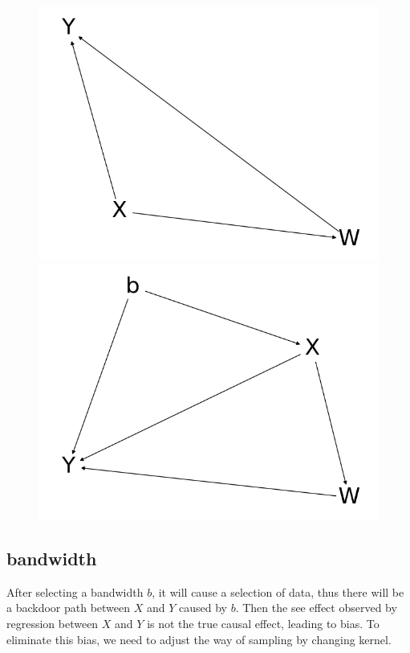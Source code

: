 \documentclass[a4 paper,12pt]{article}
\begin{document}
\begin{figure}[h]
	\centering
	\includegraphics[scale=0.5]{Figure_1.png}
	\includegraphics[scale=0.5]{Figure_2.png}
\end{figure}

\subsection*{bandwidth}
After selecting a bandwidth $b$, it will cause a selection of data, thus there will be a backdoor path between $X$ and $Y$ caused by $b$. Then the see effect observed by regression between $X$ and $Y$ is not the true causal effect, leading to bias. To eliminate this bias, we need to adjust the way of sampling by changing kernel. 
\end{document}
